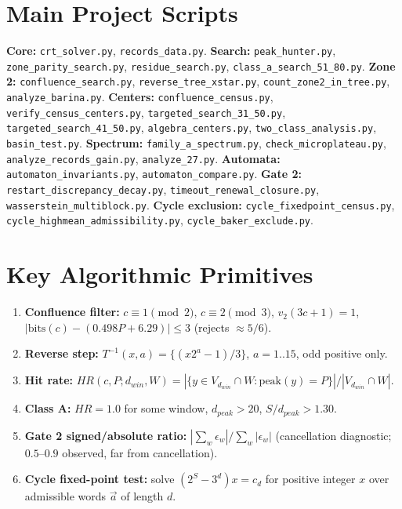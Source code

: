 \documentclass[12pt,a4paper]{article}
\theoremstyle{remark}
\begin{document}
\section{Main Project Scripts}
\begin{flushleft}
\textbf{Core:} \texttt{crt\_solver.py}, \texttt{records\_data.py}. \textbf{Search:} \texttt{peak\_hunter.py}, \texttt{zone\_parity\_search.py}, \texttt{residue\_search.py}, \texttt{class\_a\_search\_51\_80.py}. \textbf{Zone 2:} \texttt{confluence\_search.py}, \texttt{reverse\_tree\_xstar.py}, \texttt{count\_zone2\_in\_tree.py}, \texttt{analyze\_barina.py}. \textbf{Centers:} \texttt{confluence\_census.py}, \texttt{verify\_census\_centers.py}, \texttt{targeted\_search\_31\_50.py}, \texttt{targeted\_search\_41\_50.py}, \texttt{algebra\_centers.py}, \texttt{two\_class\_analysis.py}, \texttt{basin\_test.py}. \textbf{Spectrum:} \texttt{family\_a\_spectrum.py}, \texttt{check\_microplateau.py}, \texttt{analyze\_records\_gain.py}, \texttt{analyze\_27.py}. \textbf{Automata:} \texttt{automaton\_invariants.py}, \texttt{automaton\_compare.py}. \textbf{Gate 2:} \texttt{restart\_discrepancy\_decay.py}, \texttt{timeout\_renewal\_closure.py}, \texttt{wasserstein\_multiblock.py}. \textbf{Cycle exclusion:} \texttt{cycle\_fixedpoint\_census.py}, \texttt{cycle\_highmean\_admissibility.py}, \texttt{cycle\_baker\_exclude.py}.
\end{flushleft}

\section{Key Algorithmic Primitives}
\begin{enumerate}
\item \textbf{Confluence filter:} $c\equiv1\pmod2$, $c\equiv2\pmod3$, $v_2(3c+1)=1$, $|\mathrm{bits}(c)-(0.498P+6.29)|\le3$ (rejects $\approx5/6$).
\item \textbf{Reverse step:} $T^{-1}(x,a)=\{(x2^a-1)/3\}$, $a=1..15$, odd positive only.
\item \textbf{Hit rate:} $HR(c,P;d_{win},W)=|\{y\in V_{d_{win}}\cap W:\mathrm{peak}(y)=P\}|/|V_{d_{win}}\cap W|$.
\item \textbf{Class A:} $HR=1.0$ for some window, $d_{peak}>20$, $S/d_{peak}>1.30$.
\item \textbf{Gate 2 signed/absolute ratio:} $|\sum_w\epsilon_w|/\sum_w|\epsilon_w|$ (cancellation diagnostic; $0.5$--$0.9$ observed, far from cancellation).
\item \textbf{Cycle fixed-point test:} solve $(2^{S}-3^{d})x=c_d$ for positive integer $x$ over admissible words $\vec a$ of length $d$.
\end{enumerate}
\end{document}

